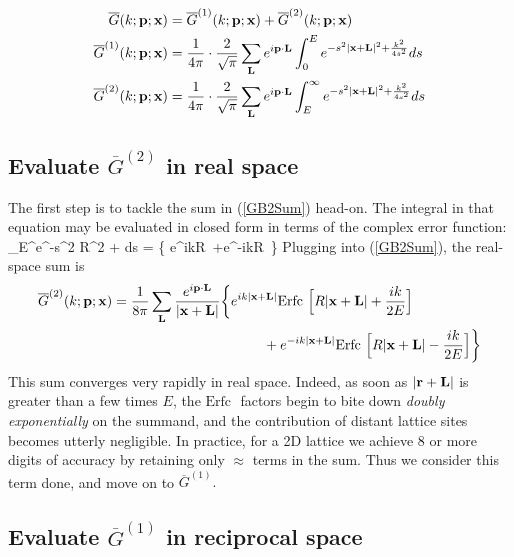 \documentclass[letterpaper]{article}
\newcommand{\GB}{\overline{G}}
\newcommand{\erfc}{\text{Erfc }}
\begin{document}
\begin{align}
\GB(k; \vb p; \vb x) 
 &= \GB^{(1)}(k; \vb p; \vb x) 
   +\GB^{(2)}(k; \vb p; \vb x) 
\label{GBDecomposition}
\\
\GB^{(1)}(k; \vb p; \vb x) 
&= \frac{1}{4\pi} \cdot \frac{2}{\sqrt{\pi}}
   \sum_{\vb L} e^{i\vb p \cdot \vb L} \int_0^E e^{-s^2 |\vb x+\vb L|^2 + \frac{k^2}{4s^2}} ds
\label{GB1Sum}
\\
\GB^{(2)}(k; \vb p; \vb x) 
&= \frac{1}{4\pi} \cdot \frac{2}{\sqrt{\pi}}
   \sum_{\vb L} e^{i\vb p \cdot \vb L} \int_E^\infty e^{-s^2 |\vb x + \vb L|^2 + \frac{k^2}{4s^2}} ds
\label{GB2Sum}
\end{align}

\subsection*{Evaluate $\GB^{(2)}$ in real space} 

The first step is to tackle the sum in (\ref{GB2Sum}) head-on. 
The integral in that equation may be evaluated in closed form in terms of
the complex error function:
{
 \int_E^\infty e^{-s^2 R^2 + } ds
 = \bigg\{ e^{ikR} \,\erfc{}
                     +e^{-ikR} \,\erfc{}
               \bigg\}
}
Plugging into (\ref{GB2Sum}), the real-space sum is 
\begin{align*}
\GB^{(2)}(k; \vb p; \vb x) 
&= \frac{1}{8\pi}
   \sum_{\vb L} 
   \frac{e^{i\vb p \cdot \vb L}}{|\vb x + \vb L|}
    \bigg\{ e^{ik|\vb x + \vb L|}
            \erfc\Big[R|\vb x + \vb L| + \frac{ik}{2E} \Big]
\\
&\hspace{1.5in}
 +          e^{-ik|\vb x + \vb L|}
    \erfc\Big[R|\vb x + \vb L| - \frac{ik}{2E} \Big]
    \bigg\}
\end{align*}
This sum converges very rapidly in real space. Indeed, as soon as 
$|\mathbf{r} + \mathbf{L}|$ is greater than a few times $E$, the $\erfc$\!\!
factors begin to bite down \textit{doubly exponentially} on the
summand, and the contribution of distant lattice sites becomes 
utterly negligible. In practice, for a 2D lattice we achieve 8 
or more digits of accuracy by retaining only $\approx$ terms in the sum.
Thus we consider this term done, and move on to $\GB^{(1)}.$ 

\subsection*{Evaluate $\GB^{(1)}$ in reciprocal space} 
\end{document}
